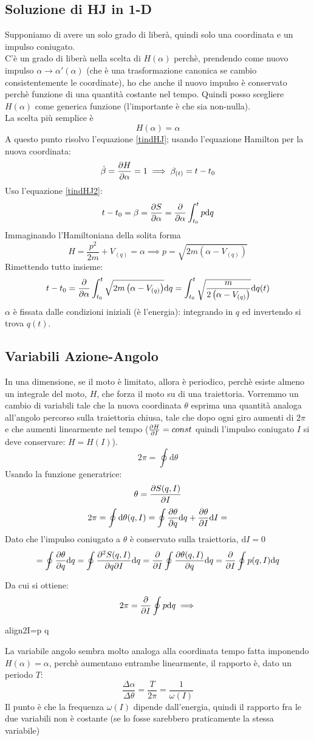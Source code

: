 \documentclass[a4paper,12pt]{article}
\renewcommand{\arg}[1]{_{(#1)}}
\newcommand{\boxedeq}[2]{\begin{empheq}[box={\fboxsep=6pt\fbox}]{align}\label{#1}#2\end{empheq}}
\theoremstyle{plain}
\theoremstyle{definition}
\newcommand{\f}[2]{\frac{#1}{#2}}
\renewcommand{\d}{\text{d}}
\theoremstyle{remark}
\begin{document}
\subsection{Soluzione di HJ in 1-D}
Supponiamo di avere un solo grado di liberà, quindi solo una coordinata e un impulso coniugato.
\\ C'è un grado di liberà nella scelta di $H(\alpha)$ perchè, prendendo come nuovo impulso $\alpha\rightarrow \alpha'(\alpha)$ (che è una trasformazione canonica se cambio consistentemente le coordinate), ho che anche il nuovo impulso è conservato perchè funzione di una quantità costante nel tempo. Quindi posso scegliere $H(\alpha)$ come generica funzione (l'importante è che sia non-nulla).\\ La scelta più semplice è\[H(\alpha)=\alpha\]
A questo punto risolvo l'equazione \ref{tindHJ}; usando l'equazione Hamilton per la nuova coordinata:
\[\dot{\beta}=\pdv{H}{\alpha}=1\implies\beta\arg{t}=t-t_0			\]
Uso l'equazione \ref{tindHJ2}:
\[t-t_0=\beta=\pdv{S}{\alpha}=\pdv{\alpha} \int_{t_0}^t	p\d q\]
Immaginando l'Hamiltoniana della solita forma
\[H=\f{p^2}{2m}+V\arg{q}=\alpha\implies p=\sqrt{2m\left(\alpha-V\arg{q}\right)}			\]
Rimettendo tutto insieme:
\[t-t_0=\pdv{\alpha} \int_{t_0}^t\sqrt{2m\left(\alpha-V\arg{q}\right)}	\d q=
\int_{t_0}^t\sqrt{\f{m}{2\left(\alpha-V\arg{q}\right)}}	\d q(t)
\]
$\alpha$ è fissata dalle condizioni iniziali (è l'energia): integrando in $q$ ed invertendo si trova $q(t)$.
\subsection{Variabili Azione-Angolo}
In una dimensione, se il moto è limitato, allora è periodico, perchè esiste almeno un integrale del moto, $H$, che forza il moto su di una traiettoria. Vorremmo un cambio di variabili tale che la nuova coordinata $\theta$ esprima una quantità analoga all'angolo percorso sulla traiettoria chiusa, tale che dopo ogni giro aumenti di $2\pi$  e che aumenti linearmente nel tempo ($\pdv{H}{I}=const$ quindi l'impulso coniugato $I$ si deve conservare: $H=H(I)$).\[2\pi=	\oint\d \theta	\]
Usando la funzione generatrice:
\[\theta= \pdv{S(q,I)}{I}	\]
\[2\pi=	\oint \d \theta(q,I)=\oint \pdv{\theta}{q} \d q+ \pdv{\theta}{I} \d I	=\]
Dato che l'impulso coniugato a $\theta$ è conservato sulla traiettoria, $\d I=0$
\[=\oint \pdv{\theta}{q} \d q=\oint \pdv[2]{S(q,I)}{q}{I} \d q=\pdv{I}\oint \pdv{\theta(q,I)}{q} \d q=\pdv{I}\oint p(q,I) \d q\]

Da cui si ottiene:
\[ 2\pi=		\pdv{I}\oint p \d q\implies\]
\boxedeq{Actionangle}{2\pi I=\oint p \d q	}
\begin{obs}

La variabile angolo sembra molto analoga alla coordinata tempo fatta imponendo $H(\alpha)=\alpha$, perchè aumentano entrambe linearmente, il rapporto è, dato un periodo $T$:
\[\f{\Delta \alpha}{\Delta \theta}=\f{T}{2\pi}=\f{1}{\omega(I)}			\]
Il punto è che la frequenza $\omega(I)$ dipende dall'energia, quindi il rapporto fra le due variabili non è costante (se lo fosse sarebbero praticamente la stessa variabile)
\end{obs}
\end{document}
